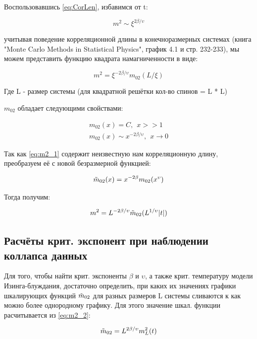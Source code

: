Воспользовавшись \eqref{eq:CorLen}, избавимся от t:

\begin{equation}
    m^{2} \sim \xi ^{2\beta/\upsilon}
\end{equation}

учитывая поведение корреляционной длины в конечноразмерных системах (книга "Monte Carlo Methods in Statistical Physics", график 4.1 и стр. 232-233)\cite{NewBar}, мы можем представить функцию квадрата намагниченности в виде:

\begin{equation}\label{eq:m2_1}
    m^{2} = \xi ^{-2\beta/\upsilon} m_{02}(L/\xi)
\end{equation}

Где L - размер системы (для квадратной решётки кол-во спинов = L * L)

$m_{02}$ обладает следующими свойствами:

\begin{align*}
    m_{02}(x) = C,\ \ x >> 1 \\
    m_{02}(x) \sim x^{-2\beta/\upsilon},\ \ x \rightarrow 0
\end{align*}

Так как \eqref{eq:m2_1} содержит неизвестную нам корреляционную длину, преобразуем её с новой безразмерной функцией:

\begin{equation}
    \Tilde{m}_{02}(x) = x^{-2\beta} m_{02}(x^{\upsilon})
\end{equation}

Тогда получим:

\begin{equation}\label{eq:m2_2}
    m^{2} = L^{-2\beta/\upsilon} \Tilde{m}_{02}(L^{1/\upsilon}|t|)
\end{equation}

\subsection{Расчёты крит. экспонент при наблюдении коллапса данных}
Для того, чтобы найти крит. экспоненты $\beta$ и $\upsilon$, а также крит. температуру модели Изинга-блуждания, достаточно определить, при каких их значениях графики шкалирующих функций $\Tilde{m}_{02}$ для разных размеров L системы сливаются к как можно более однородному графику. Для этого значение шкал. функции расчитывается из \eqref{eq:m2_2}:

\begin{equation}\label{eq:m02}
    \Tilde{m}_{02} = L^{2\beta/\upsilon} m_{L}^{2}(t)
\end{equation}

